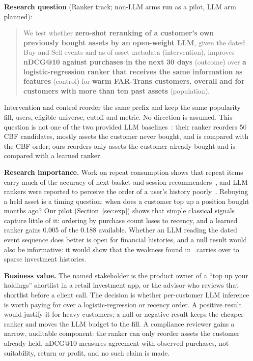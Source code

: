 \documentclass[conference]{IEEEtran}
\begin{document}
\textbf{Research question} (Ranker track; non-LLM arms run as a pilot, LLM arm planned):
\begin{quote}
We test whether \textbf{zero-shot reranking of a customer's own previously bought assets by an open-weight LLM}, given the dated Buy and Sell events and as-of asset metadata (intervention), improves \textbf{nDCG@10 against purchases in the next 30 days} (outcome) over \textbf{a logistic-regression ranker that receives the same information as features} (control) for \textbf{warm FAR-Trans customers, overall and for customers with more than ten past assets} (population).
\end{quote}
Intervention and control reorder the same prefix and keep the same popularity fill, users, eligible universe, cutoff and metric. No direction is assumed. This question is not one of the two provided LLM baselines~\cite{baselines}: their ranker reorders 50 CBF candidates, mostly assets the customer never bought, and is compared with the CBF order; ours reorders only assets the customer already bought and is compared with a learned ranker.

\textbf{Research importance.} Work on repeat consumption shows that repeat items carry much of the accuracy of next-basket and session recommenders~\cite{repeatnet,nbrcheck}, and LLM rankers were reported to perceive the order of a user's history poorly~\cite{llmrank}. Rebuying a held asset is a timing question: when does a customer top up a position bought months ago? Our pilot (Section~\ref{sec:exp}) shows that simple classical signals capture little of it: ordering by purchase count loses to recency, and a learned ranker gains 0.005 of the 0.188 available. Whether an LLM reading the dated event sequence does better is open for financial histories, and a null result would also be informative: it would show that the weakness found in~\cite{llmrank} carries over to sparse investment histories.

\textbf{Business value.} The named stakeholder is the product owner of a ``top up your holdings'' shortlist in a retail investment app, or the advisor who reviews that shortlist before a client call. The decision is whether per-customer LLM inference is worth paying for over a logistic-regression or recency order. A positive result would justify it for heavy customers; a null or negative result keeps the cheaper ranker and moves the LLM budget to the fill. A compliance reviewer gains a narrow, auditable component: the ranker can only reorder assets the customer already held. nDCG@10 measures agreement with observed purchases, not suitability, return or profit, and no such claim is made.
\end{document}
